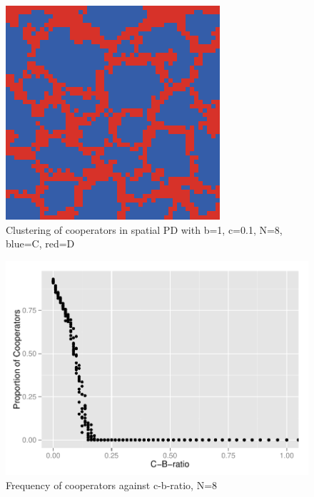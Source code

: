 \documentclass[DIV=calc, paper=a4, fontsize=11pt, twocolumn]{scrartcl}	 %
\begin{document}
\begin{figure}[here]
\centering
\begin{minipage}{.35\textwidth}
  \centering
  \includegraphics[width=1\linewidth]{PDspatial8cost01}
 \caption{Clustering of cooperators in spatial PD with b=1, c=0.1, N=8, blue=C, red=D}
\label{fig:PDspatialcluster}
\end{minipage}%
\end{figure}

\begin{figure}
\begin{minipage}{.48\textwidth}
  \centering
  \includegraphics[width=1\linewidth]{spatialPDratio}
 \caption{Frequency of cooperators against c-b-ratio, N=8}
  \label{fig:PDspatialfreq}
\end{minipage}
\end{figure}
\end{document}
